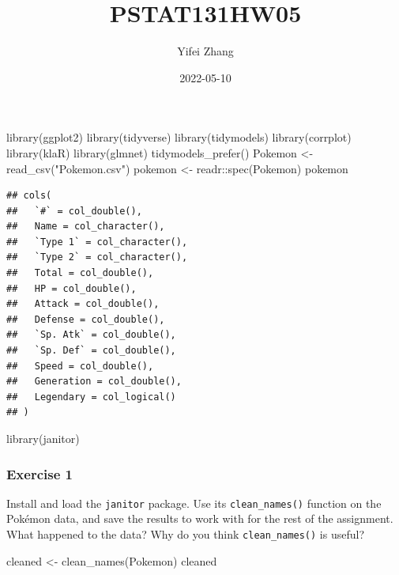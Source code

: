 \documentclass[
]{article}
\title{PSTAT131HW05}
\author{Yifei Zhang}
\date{2022-05-10}
\newenvironment{Shaded}{\begin{snugshade}}{\end{snugshade}}
\newcommand{\FunctionTok}[1]{\textcolor[rgb]{0.00,0.00,0.00}{#1}}
\newcommand{\NormalTok}[1]{#1}
\newcommand{\OtherTok}[1]{\textcolor[rgb]{0.56,0.35,0.01}{#1}}
\newcommand{\SpecialCharTok}[1]{\textcolor[rgb]{0.00,0.00,0.00}{#1}}
\newcommand{\StringTok}[1]{\textcolor[rgb]{0.31,0.60,0.02}{#1}}
\begin{document}
\maketitle

\begin{Shaded}
\begin{Highlighting}[]
\FunctionTok{library}\NormalTok{(ggplot2)}
\FunctionTok{library}\NormalTok{(tidyverse)}
\FunctionTok{library}\NormalTok{(tidymodels)}
\FunctionTok{library}\NormalTok{(corrplot)}
\FunctionTok{library}\NormalTok{(klaR)}
\FunctionTok{library}\NormalTok{(glmnet)}
\FunctionTok{tidymodels\_prefer}\NormalTok{()}
\NormalTok{Pokemon }\OtherTok{\textless{}{-}} \FunctionTok{read\_csv}\NormalTok{(}\StringTok{"Pokemon.csv"}\NormalTok{)}
\NormalTok{pokemon }\OtherTok{\textless{}{-}}\NormalTok{ readr}\SpecialCharTok{::}\FunctionTok{spec}\NormalTok{(Pokemon)}
\NormalTok{pokemon}
\end{Highlighting}
\end{Shaded}

\begin{verbatim}
## cols(
##   `#` = col_double(),
##   Name = col_character(),
##   `Type 1` = col_character(),
##   `Type 2` = col_character(),
##   Total = col_double(),
##   HP = col_double(),
##   Attack = col_double(),
##   Defense = col_double(),
##   `Sp. Atk` = col_double(),
##   `Sp. Def` = col_double(),
##   Speed = col_double(),
##   Generation = col_double(),
##   Legendary = col_logical()
## )
\end{verbatim}

\begin{Shaded}
\begin{Highlighting}[]
\FunctionTok{library}\NormalTok{(janitor)}
\end{Highlighting}
\end{Shaded}

\hypertarget{exercise-1}{%
\subsubsection{Exercise 1}\label{exercise-1}}

Install and load the \texttt{janitor} package. Use its
\texttt{clean\_names()} function on the Pokémon data, and save the
results to work with for the rest of the assignment. What happened to
the data? Why do you think \texttt{clean\_names()} is useful?

\begin{Shaded}
\begin{Highlighting}[]
\NormalTok{cleaned }\OtherTok{\textless{}{-}} \FunctionTok{clean\_names}\NormalTok{(Pokemon)}
\NormalTok{cleaned}
\end{Highlighting}
\end{Shaded}
\end{document}
